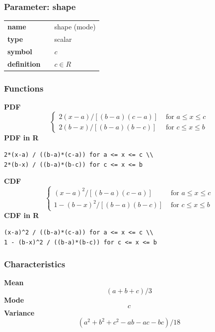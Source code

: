 \subsubsection*{Parameter: shape}

\noindent\begin{tabular}{p{2cm}cl}
\textbf{name} & & shape (mode) \\
\textbf{type} & & scalar \\
\textbf{symbol} & & $c$  \\
\textbf{definition} & & $c \in R$
\end{tabular}
\subsubsection*{Functions}

\smallskip \noindent \hspace{.2cm} \textbf{PDF} 
\begin{equation*}\begin{cases}
2(x-a) / [(b-a)(c-a)] & \text{ for } a \leq x \leq c \\
2(b-x) / [(b-a)(b-c)] & \text{ for } c \leq x \leq b
\end{cases}\end{equation*}
\smallskip \noindent \hspace{.2cm} \textbf{PDF in R}  
\begin{verbatim}2*(x-a) / ((b-a)*(c-a)) for a <= x <= c \\
2*(b-x) / ((b-a)*(b-c)) for c <= x <= b \end{verbatim}
\smallskip \noindent \hspace{.2cm} \textbf{CDF} 
\begin{equation*}\begin{cases}
(x-a)^2 / [(b-a)(c-a)] & \text{ for } a \leq x \leq c \\
1 - (b-x)^2 / [(b-a)(b-c)] & \text{ for } c \leq x \leq b
\end{cases}\end{equation*}
\smallskip \noindent \hspace{.2cm} \textbf{CDF in R} 
\begin{verbatim}(x-a)^2 / ((b-a)*(c-a)) for a <= x <= c \\
1 - (b-x)^2 / ((b-a)*(b-c)) for c <= x <= b \end{verbatim}
\smallskip
\subsubsection*{Characteristics}
\smallskip \noindent \hspace{.2cm} \textbf{Mean} 
\begin{equation*}(a+b+c)/3\end{equation*}
\smallskip \noindent \hspace{.2cm} \textbf{Mode} 
\begin{equation*}c\end{equation*}
\smallskip \noindent \hspace{.2cm} \textbf{Variance} 
\begin{equation*}(a^2 + b^2 + c^2 - ab - ac - bc)/18\end{equation*}
\smallskip
